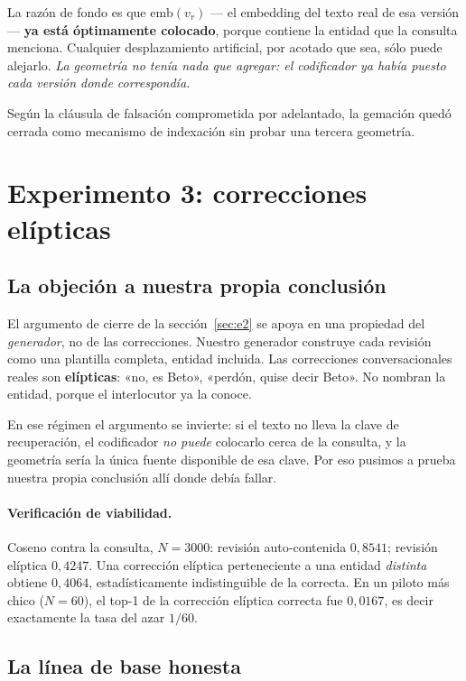 \documentclass[11pt,a4paper]{article}
\begin{document}
La razón de fondo es que $\mathrm{emb}(v_r)$ --- el embedding del texto real de esa versión ---
\textbf{ya está óptimamente colocado}, porque contiene la entidad que la consulta menciona. Cualquier
desplazamiento artificial, por acotado que sea, sólo puede alejarlo. \emph{La geometría no tenía nada
que agregar: el codificador ya había puesto cada versión donde correspondía.}

Según la cláusula de falsación comprometida por adelantado, la gemación quedó cerrada como mecanismo
de indexación sin probar una tercera geometría.

\section{Experimento 3: correcciones elípticas}
\label{sec:e3}

\subsection{La objeción a nuestra propia conclusión}

El argumento de cierre de la sección~\ref{sec:e2} se apoya en una propiedad del \emph{generador}, no
de las correcciones. Nuestro generador construye cada revisión como una plantilla completa, entidad
incluida. Las correcciones conversacionales reales son \textbf{elípticas}: «no, es Beto», «perdón,
quise decir Beto». No nombran la entidad, porque el interlocutor ya la conoce.

En ese régimen el argumento se invierte: si el texto no lleva la clave de recuperación, el
codificador \emph{no puede} colocarlo cerca de la consulta, y la geometría sería la única fuente
disponible de esa clave. Por eso pusimos a prueba nuestra propia conclusión allí donde debía fallar.

\paragraph{Verificación de viabilidad.} Coseno contra la consulta, $N=3000$: revisión auto-contenida
$0{,}8541$; revisión elíptica $0{,}4247$. Una corrección elíptica perteneciente a una entidad
\emph{distinta} obtiene $0{,}4064$, estadísticamente indistinguible de la correcta. En un piloto más
chico ($N=60$), el top-1 de la corrección elíptica correcta fue $0{,}0167$, es decir exactamente la
tasa del azar $1/60$.

\subsection{La línea de base honesta}
\end{document}
